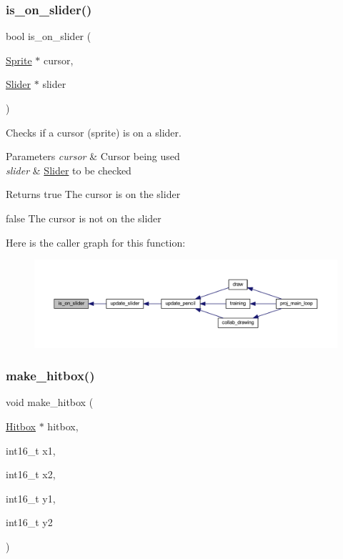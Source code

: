 \subsubsection{\texorpdfstring{is\+\_\+on\+\_\+slider()}{is\_on\_slider()}}
{\footnotesize\ttfamily bool is\+\_\+on\+\_\+slider (\begin{DoxyParamCaption}\item[{\mbox{\hyperlink{struct_sprite}{Sprite}} $\ast$}]{cursor,  }\item[{\mbox{\hyperlink{struct_slider}{Slider}} $\ast$}]{slider }\end{DoxyParamCaption})}



Checks if a cursor (sprite) is on a slider. 


\begin{DoxyParams}{Parameters}
{\em cursor} & Cursor being used \\
\hline
{\em slider} & \mbox{\hyperlink{struct_slider}{Slider}} to be checked \\
\hline
\end{DoxyParams}
\begin{DoxyReturn}{Returns}
true The cursor is on the slider 

false The cursor is not on the slider 
\end{DoxyReturn}
Here is the caller graph for this function\+:\nopagebreak
\begin{figure}[H]
\begin{center}
\leavevmode
\includegraphics[width=350pt]{group__sprite_gaa77fff83958c7ed7ab6e99a25d574ce2_icgraph}
\end{center}
\end{figure}
\mbox{\label{group__sprite_gadaf8e12cd78fdf0d2ea5b182ed1072c1}} 
\subsubsection{\texorpdfstring{make\+\_\+hitbox()}{make\_hitbox()}}
{\footnotesize\ttfamily void make\+\_\+hitbox (\begin{DoxyParamCaption}\item[{\mbox{\hyperlink{struct_hitbox}{Hitbox}} $\ast$}]{hitbox,  }\item[{int16\+\_\+t}]{x1,  }\item[{int16\+\_\+t}]{x2,  }\item[{int16\+\_\+t}]{y1,  }\item[{int16\+\_\+t}]{y2 }\end{DoxyParamCaption})}



